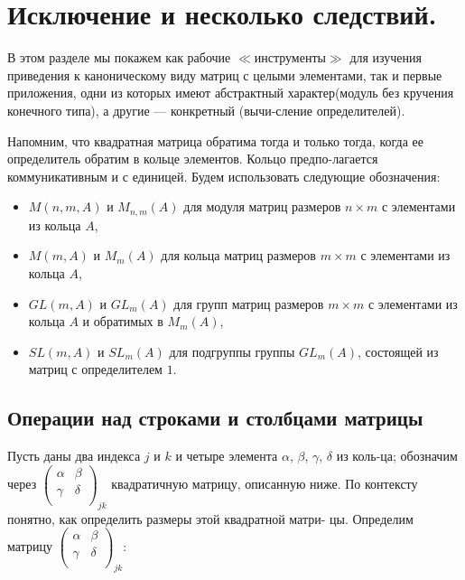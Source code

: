\documentclass{mai_book}
\begin{document}
\section{Исключение и несколько следствий.}
В этом разделе мы покажем как рабочие $\ll$инструменты$\gg$ для изучения \linebreak приведения к каноническому виду матриц с целыми элементами, так \linebreak и первые приложения, одни из которых имеют абстрактный характер\linebreak (модуль без кручения конечного типа), а другие --- конкретный (вычи-\linebreak сление определителей). 
  
  Напомним, что квадратная матрица обратима тогда и только тогда, \linebreak когда ее определитель обратим в кольце элементов. Кольцо предпо-\linebreak лагается коммуникативным и с единицей. Будем использовать следующие обозначения:
\begin{itemize}
  \item $M(n, m, A)$ и $M_{n,m}(A)$ для модуля матриц размеров $n\times m$ с
  элементами из кольца $A$,
  \item  $M(m,A)$ и $M_m(A)$ для кольца матриц размеров $m\times m$ с
  элементами  из кольца $A$,
  \item  $GL(m,A)$ и $GL_m(A)$ для групп матриц размеров $m\times m$ с 
  элементами из кольца $A$ и обратимых в $M_m(A)$,
  \item  $SL(m,A)$ и $SL_m(A)$ для подгруппы группы $GL_m(A)$, состоящей 
  из матриц с определителем $1$.
  \end{itemize}
\subsection{Операции над строками и столбцами матрицы}

Пусть даны два индекса $j$ и $k$ и четыре элемента $\alpha$, $\beta$, $\gamma$, $\delta$ из коль-\linebreak ца; обозначим через ${\left( \begin{array}{ccc}
\alpha & \beta \\
\gamma & \delta \\
\end{array} \right)}_{jk}$ квадратичную матрицу, описанную ниже. По контексту понятно, как определить размеры этой квадратной матри- \linebreak цы. Определим матрицу 
${\left( \begin{array}{ccc}
\alpha & \beta \\
\gamma & \delta \\
\end{array} \right)}_{jk}$:
\end{document}

